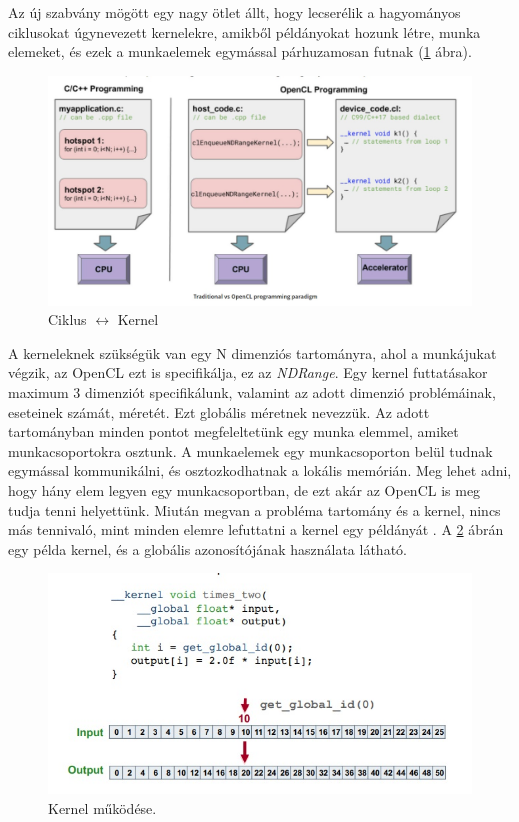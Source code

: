 Az új szabvány mögött egy nagy ötlet állt, hogy lecserélik a hagyományos ciklusokat úgynevezett kernelekre, amikből példányokat hozunk létre, munka elemeket, és ezek a munkaelemek egymással párhuzamosan futnak (\ref{fig:loopVsKernel} ábra).

\begin{figure}[h]
\centering
\includegraphics[scale=0.4]{images/loopvskernel.jpg}
\caption{Ciklus $\leftrightarrow$ Kernel \cite{opencl}}
\label{fig:loopVsKernel}
\end{figure}

A kerneleknek szükségük van egy N dimenziós tartományra, ahol a munkájukat végzik, az OpenCL  ezt is specifikálja, ez az \textit{NDRange}. Egy kernel futtatásakor maximum 3 dimenziót specifikálunk, valamint az adott dimenzió problémáinak, eseteinek számát, méretét. Ezt globális méretnek nevezzük. Az adott tartományban minden pontot megfeleltetünk egy munka elemmel, amiket munkacsoportokra osztunk. A munkaelemek egy munkacsoporton belül tudnak egymással kommunikálni, és osztozkodhatnak a lokális memórián. Meg lehet adni, hogy hány elem legyen egy munkacsoportban, de ezt akár az OpenCL is meg tudja tenni helyettünk. Miután megvan a probléma tartomány és a  kernel, nincs más tennivaló, mint minden elemre lefuttatni a kernel egy példányát \cite{opencl_origin}. A \ref{fig:kernel} ábrán egy példa kernel, és a globális azonosítójának használata látható.
 
\begin{figure}[h]
\centering
\includegraphics[scale=0.7]{images/kernel.jpg}
\caption{Kernel működése. \cite{opencl_origin}}
\label{fig:kernel}
\end{figure}

